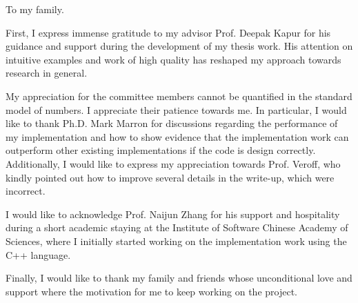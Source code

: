 \begin{dedication}
  To my family.
\end{dedication}

\begin{acknowledgments}
  \vspace{1.1in}

  First, I express immense gratitude to my
  advisor Prof. Deepak Kapur for his guidance 
  and support during the development of my 
  thesis work. His attention on intuitive 
  examples and work of high quality has
  reshaped my approach towards research in 
  general. 

  My appreciation for the committee members
  cannot be quantified in the standard
  model of numbers. I appreciate their patience 
  towards me.
  In particular, I would like to thank Ph.D. Mark
  Marron for discussions regarding the performance
  of my implementation and how to show evidence
  that the implementation work can outperform
  other existing implementations if the 
  code is design correctly. 
  Additionally, I would like to express 
  my appreciation towards Prof. Veroff, who kindly 
  pointed out how to improve several details 
  in the write-up, which were
  incorrect.

  I would like to acknowledge Prof. Naijun Zhang
  for his support and hospitality during a
  short academic staying at the Institute
  of Software Chinese Academy of Sciences, where
  I initially started working on the 
  implementation work using the C++ language.

  Finally, I would like to thank my family and
  friends whose unconditional love and support 
  where the motivation for me to keep working 
  on the project.

\end{acknowledgments}

